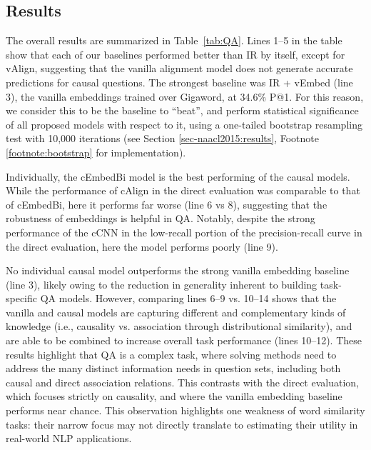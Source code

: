 \subsection{Results}
\label{sec-emnlp2016:results}
The overall results are summarized in Table~\ref{tab:QA}.
Lines 1--5 in the table show that each of our baselines performed better than IR by itself, except for vAlign, suggesting that the vanilla alignment model does not generate accurate predictions for causal questions.
The strongest baseline was IR + vEmbed (line 3), the vanilla embeddings trained over Gigaword, at 34.6\% P@1. For this reason, we consider this to be the baseline to ``beat'', and perform statistical significance of all proposed models with respect to it, using a one-tailed bootstrap resampling test with 10,000 iterations (see Section \ref{sec-naacl2015:results}, Footnote \ref{footnote:bootstrap} for implementation). 

Individually, the cEmbedBi model is the best performing of the causal models.  While the performance of cAlign in the direct evaluation was comparable to that of cEmbedBi, here it performs far worse (line 6 vs 8), suggesting that the robustness of embeddings is helpful in QA.  Notably, despite the strong performance of the cCNN in the low-recall portion of the precision-recall curve in the direct evaluation, here the model performs poorly (line 9).

No individual causal model outperforms the strong vanilla embedding baseline (line 3), likely owing to the reduction in generality inherent to building task-specific QA models.
However, comparing lines 6--9 vs. 10--14 shows that the vanilla and causal models are capturing different and complementary kinds of knowledge (i.e., causality vs. association through distributional similarity), and are able to be combined to increase overall task performance (lines 10--12).  These results highlight that QA is a complex task, where solving methods need to address the many distinct information needs in question sets, including both causal and direct association relations.  This contrasts with the direct evaluation, which focuses strictly on causality, and where the vanilla embedding baseline performs near chance. This observation highlights one weakness of word similarity tasks: their narrow focus may not directly translate to estimating their utility in real-world NLP applications. %


